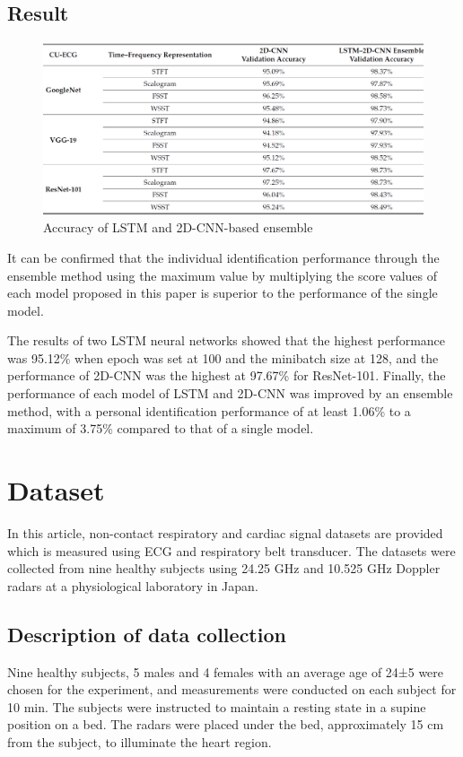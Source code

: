 \documentclass[dvipdfmx]{article}
\begin{document}
\subsection{Result}
\begin{figure}[H]
\begin{center}
\includegraphics[width=\linewidth]{./img/ensemble_result.png}
\end{center}
\caption{Accuracy of LSTM and 2D-CNN-based ensemble}
\end{figure}

It can be confirmed that the individual identification performance through the ensemble method using the maximum value by multiplying the score values of each model proposed in this paper is superior to the performance of the single model.

The results of two LSTM neural networks showed that the highest performance was 95.12\% when epoch was set at 100 and the minibatch size at 128, and the performance of 2D-CNN was the highest at 97.67\% for ResNet-101. Finally, the performance of each model of LSTM and 2D-CNN was improved by an ensemble method, with a personal identification performance of at least 1.06\% to a maximum of 3.75\% compared to that of a single model.


\section{Dataset\cite{dataset}}
In this article, non-contact respiratory and cardiac signal datasets are provided which is measured using ECG and respiratory belt transducer. The datasets were collected from nine healthy subjects using 24.25 GHz and 10.525 GHz Doppler radars at a physiological laboratory in Japan. 

\subsection*{Description of data collection}
Nine healthy subjects, 5 males and 4 females with an average age of 24±5 were chosen for the experiment, and measurements were conducted on each subject for 10 min. The subjects were instructed to maintain a resting state in a supine position on a bed. The radars were placed under the bed, approximately 15 cm from the subject, to illuminate the heart region.
\end{document}
